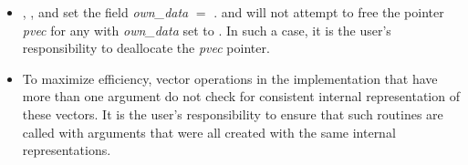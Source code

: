 \begin{itemize}
                                        
\item
  {\warn}, , and
   set the field {\em own\_data} $=$ .   
   and 
  will not attempt to free the pointer {\em pvec} for any  with
  {\em own\_data} set to . In such a case, it is the user's responsibility to
  deallocate the {\em pvec} pointer.

\item
  {\warn}To maximize efficiency, vector operations in the {\nvecpetsc} implementation
  that have more than one  argument do not check for
  consistent internal representation of these vectors. It is the user's 
  responsibility to ensure that such routines are called with 
  arguments that were all created with the same internal representations.

\end{itemize}

